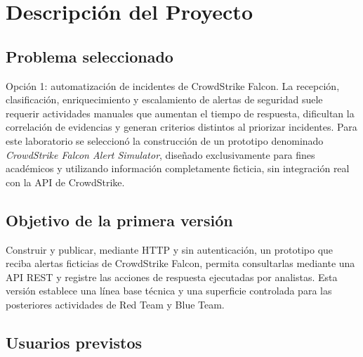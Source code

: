 \documentclass[journal]{IEEEtran}
\begin{document}

\section{Descripción del Proyecto}

\subsection{Problema seleccionado}

Opción 1: automatización de incidentes de CrowdStrike Falcon. La recepción,
clasificación, enriquecimiento y escalamiento de alertas de seguridad suele
requerir actividades manuales que aumentan el tiempo de respuesta, dificultan
la correlación de evidencias y generan criterios distintos al priorizar
incidentes. Para este laboratorio se seleccionó la construcción de un
prototipo denominado \textit{CrowdStrike Falcon Alert Simulator}, diseñado
exclusivamente para fines académicos y utilizando información completamente
ficticia, sin integración real con la API de CrowdStrike.

\subsection{Objetivo de la primera versión}

Construir y publicar, mediante HTTP y sin autenticación, un prototipo que
reciba alertas ficticias de CrowdStrike Falcon, permita consultarlas mediante
una API REST y registre las acciones de respuesta ejecutadas por analistas.
Esta versión establece una línea base técnica y una superficie controlada
para las posteriores actividades de Red Team y Blue Team.

\subsection{Usuarios previstos}
\end{document}
